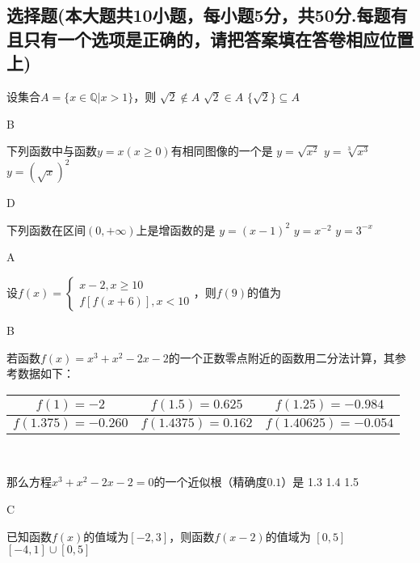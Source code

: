 \begin{exercise}
\section{选择题(本大题共10小题，每小题5分，共50分.每题有且只有一个选项是正确的，请把答案填在答卷相应位置上)}
\item
设集合$A=\{x\in\mathbb{Q}|x>1\}$，则\xz
  {$\sqrt2\notin A$}
  {$\sqrt2\in A$}
  {$\{\sqrt2\}\subseteq A$}
\begin{answer}
  B
\end{answer}
\item
下列函数中与函数$y=x(x\geq 0)$有相同图像的一个是\xz
  {$y=\sqrt{x^2}$}
  {$y=\sqrt[3]{x^3}$}
  {$y=(\displaystyle \sqrt x)^2 $}
\begin{answer}
  D
\end{answer}
\item
下列函数在区间$(0,+\infty) $上是增函数的是\xz
  {$y=(x-1)^2$}
  {$y=x^{-2}$}
  {$y=3^{-x}$}
\begin{answer}
  A
\end{answer}
\item
设$f(x)=\begin{cases}
  x-2,x\geq10\\f[f(x+6)],x<10
\end{cases}$，则$f(9)$的值为\xz
\begin{answer}
  B
\end{answer}
\item
若函数$f(x)=x^3+x^2-2x-2$的一个正数零点附近的函数用二分法计算，其参考数据如下：\\
\begin{center}
  \begin{tabular}{|c|c|c|}
    \hline
    $f(1)=-2$&$f(1.5)=0.625$&$f(1.25)=-0.984$\\
    \hline
    $f(1.375)=-0.260$&$f(1.4375)=0.162$&$f(1.40625)=-0.054$\\
    \hline
  \end{tabular}\\
\end{center}
那么方程$x^3+x^2-2x-2=0$的一个近似根（精确度$0.1$）是\xz
  {1.3}
  {1.4}
  {1.5}
\begin{answer}
  C
\end{answer}
\item
已知函数$f(x)$的值域为$[-2,3]$，则函数$f(x-2)$的值域为\xz
  \xx{$[-4,1]$}
  {$[0,5]$}
  {{$[-4,1]\cup[0,5]$}}

\end{exercise}
